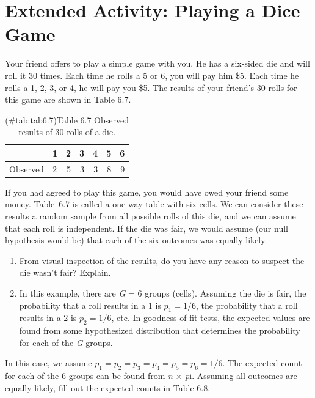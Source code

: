\documentclass[
]{report}
\providecommand{\tightlist}{%
  \setlength{\itemsep}{0pt}\setlength{\parskip}{0pt}}
\begin{document}
\section*{Extended Activity: Playing a Dice Game}\label{extended-activity-playing-a-dice-game}

Your friend offers to play a simple game with you. He has a six‑sided die and will roll it 30 times. Each time he rolls a 5 or 6, you will pay him \$5. Each time he rolls a 1, 2, 3, or 4, he will pay you \$5. The results of your friend's 30 rolls for this game are shown in Table 6.7.

\begin{table}[!h]
\centering
\caption{(\#tab:tab6.7)Table 6.7 Observed results of 30 rolls of a die.}
\centering
\begin{tabular}[t]{llrrrrr}
\toprule
  & 1 & 2 & 3 & 4 & 5 & 6\\
\midrule
Observed & 2 & 5 & 3 & 3 & 8 & 9\\
\bottomrule
\end{tabular}
\end{table}

If you had agreed to play this game, you would have owed your friend some money. Table~6.7 is called a one-way table with six cells. We can consider these results a random sample from all possible rolls of this die, and we can assume that each roll is independent. If the die was fair, we would assume (our null hypothesis would be) that each of the six outcomes was equally likely.

\begin{enumerate}
\def\labelenumi{\arabic{enumi}.}
\setcounter{enumi}{31}
\tightlist
\item
  From visual inspection of the results, do you have any reason to suspect the die wasn't fair? Explain.\\
\item
  In this example, there are \emph{G} = 6 groups (cells). Assuming the die is fair, the probability that a roll results in a 1 is \(p_1 = 1/6\), the probability that a roll results in a 2 is \(p_2 = 1/6\), etc. In goodness-of-fit tests, the expected values are found from some hypothesized distribution that determines the probability for each of the \emph{G} groups.
\end{enumerate}

In this case, we assume \(p_1 = p_2 = p_3 = p_4 = p_5 = p_6 = 1/6\). The expected count for each of the 6 groups can be found from \emph{n} × \emph{p}i. Assuming all outcomes are equally likely, fill out the expected counts in Table 6.8.
\end{document}
